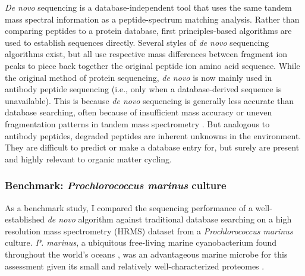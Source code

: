 \documentclass[12pt, letterpaper, twoside]{article}
\begin{document}
\textit{De novo} sequencing is a database-independent tool that uses the same tandem mass spectral information as a peptide-spectrum matching analysis. Rather than comparing peptides to a protein database, first principles-based algorithms are used to establish sequences directly. Several styles of \textit{de novo} sequencing algorithms exist, but all use respective mass differences between fragment ion peaks to piece back together the original peptide ion amino acid sequence.  While the original method of protein sequencing, \textit{de novo} is now mainly used in antibody peptide sequencing (i.e., only when a database-derived sequence is unavailable). This is because \textit{de novo} sequencing is generally less accurate than database searching, often because of insufficient mass accuracy \cite{muth_navigating_2015} or uneven fragmentation patterns in tandem mass spectrometry \cite{lu_algorithms_2004}. But analogous to antibody peptides, degraded peptides are inherent unknowns in the environment. They are difficult to predict or make a database entry for, but surely are present and highly relevant to organic matter cycling. 

\subsubsection{Benchmark: \textit{Prochlorococcus marinus} culture}

As a benchmark study, I compared the sequencing performance of a well-established \textit{de novo} algorithm against traditional database searching on a high resolution mass spectrometry (HRMS) dataset from a \textit{Prochlorococcus marinus} culture. \textit{P. marinus}, a ubiquitous free-living marine cyanobacterium found throughout the world’s oceans \cite{chisholm_novel_1988}, was an advantageous marine microbe for this assessment given its small and relatively well-characterized proteomes \cite{paul_distinct_2010}.
\end{document}
